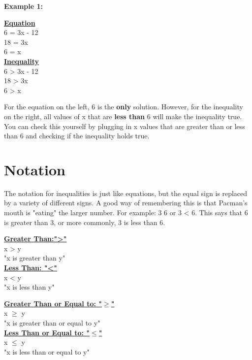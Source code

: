 \documentclass[12pt,fleqn]{book} %
\begin{document}
\noindent\textbf{Example 1:}

\begin{center}
\begin{multicols}{2}
 \underline{\textbf{Equation}}\\
 6 = 3x - 12 \\
 18 = 3x\\
 6 = x\\
 \columnbreak
 \underline{\textbf{Inequality}}\\
 6 > 3x - 12\\
 18 > 3x\\
 6 > x\\
 \end{multicols}
\end{center}

\noindent For the equation on the left, 6 is the \textbf{only} solution. However, for the inequality on the right, all values of x that are \textbf{less than} 6 will make the inequality true. You can check this yourself by plugging in x values that are greater than or less than 6 and checking if the inequality holds true. 

\section{Notation}
The notation for inequalities is just like equations, but the equal sign is replaced by a variety of different signs. A good way of remembering this is that Pacman's mouth is "eating" the larger number. For example: 3  6 or 3 < 6. This says that 6 is greater than 3, or more commonly, 3 is less than 6.

\begin{center}
\begin{multicols}{2}
 \underline{\textbf{Greater Than:">"}}\\
 x > y\\
 "x is greater than y"\\
 \columnbreak
 \underline{\textbf{Less Than: "<"}}\\
 x < y\\
 "x is less than y"\\
 \end{multicols}
\end{center}

\vspace{5mm}

\begin{center}
\begin{multicols}{2}
 \underline{\textbf{Greater Than or Equal to: "$\geq$"}}\\
 x $\geq$ y\\
 "x is greater than or equal to y"\\
 \columnbreak
 \underline{\textbf{Less Than or Equal to: "$\leq$"}}\\
 x $\leq$ y\\
 "x is less than or equal to y"\\
 \end{multicols}
\end{center}
\end{document}
